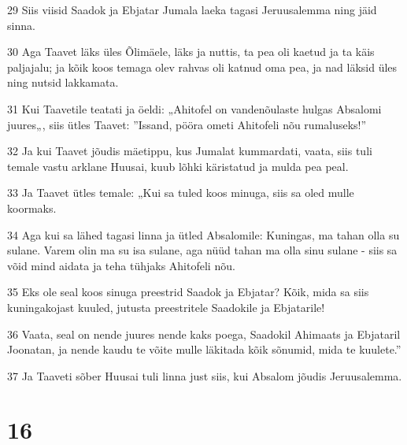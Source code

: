 \par 29 Siis viisid Saadok ja Ebjatar Jumala laeka tagasi Jeruusalemma ning jäid sinna.
\par 30 Aga Taavet läks üles Õlimäele, läks ja nuttis, ta pea oli kaetud ja ta käis paljajalu; ja kõik koos temaga olev rahvas oli katnud oma pea, ja nad läksid üles ning nutsid lakkamata.
\par 31 Kui Taavetile teatati ja öeldi: „Ahitofel on vandenõulaste hulgas Absalomi juures„, siis ütles Taavet: ”Issand, pööra ometi Ahitofeli nõu rumaluseks!”
\par 32 Ja kui Taavet jõudis mäetippu, kus Jumalat kummardati, vaata, siis tuli temale vastu arklane Huusai, kuub lõhki käristatud ja mulda pea peal.
\par 33 Ja Taavet ütles temale: „Kui sa tuled koos minuga, siis sa oled mulle koormaks.
\par 34 Aga kui sa lähed tagasi linna ja ütled Absalomile: Kuningas, ma tahan olla su sulane. Varem olin ma su isa sulane, aga nüüd tahan ma olla sinu sulane - siis sa võid mind aidata ja teha tühjaks Ahitofeli nõu.
\par 35 Eks ole seal koos sinuga preestrid Saadok ja Ebjatar? Kõik, mida sa siis kuningakojast kuuled, jutusta preestritele Saadokile ja Ebjatarile!
\par 36 Vaata, seal on nende juures nende kaks poega, Saadokil Ahimaats ja Ebjataril Joonatan, ja nende kaudu te võite mulle läkitada kõik sõnumid, mida te kuulete.”
\par 37 Ja Taaveti sõber Huusai tuli linna just siis, kui Absalom jõudis Jeruusalemma.

\chapter{16}

